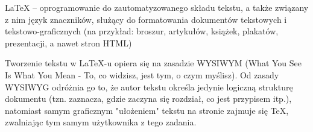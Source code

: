 \documentclass[10pt,a4paper]{article}
\begin{document}
LaTeX – oprogramowanie do zautomatyzowanego składu tekstu, a także związany z nim język znaczników, służący do formatowania dokumentów tekstowych i tekstowo-graficznych (na przykład: broszur, artykułów, książek, plakatów, prezentacji, a nawet stron HTML)

Tworzenie tekstu w LaTeX-u opiera się na zasadzie WYSIWYM (What You See Is What You Mean - To, co widzisz, jest tym, o czym myślisz). Od zasady WYSIWYG odróżnia go to, że autor tekstu określa jedynie logiczną strukturę dokumentu (tzn. zaznacza, gdzie zaczyna się rozdział, co jest przypisem itp.), natomiast samym graficznym "ułożeniem" tekstu na stronie zajmuje się TeX, zwalniając tym samym użytkownika z tego zadania.
\end{document}
